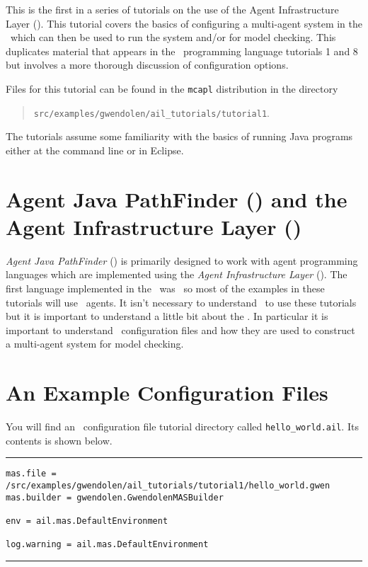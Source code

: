 
This is the first in a series of tutorials on the use of the Agent Infrastructure Layer (\ail).  This tutorial covers the basics of configuring a multi-agent system in the \ail\ which can then be used to run the system and/or for model checking.  This duplicates material that appears in the \gwendolen\ programming language tutorials 1 and 8 but involves a more thorough discussion of configuration options.

Files for this tutorial can be found in the \texttt{mcapl} distribution in the directory 
\begin{quote}
\texttt{src/examples/gwendolen/ail\_tutorials/tutorial1}.
\end{quote}

The tutorials assume some familiarity with the basics of running Java programs either at the command line or in Eclipse.

\section{Agent Java PathFinder (\ajpf) and the Agent Infrastructure Layer (\ail)}

\emph{Agent Java PathFinder} (\ajpf) is primarily designed to work with agent programming languages which are implemented using the \emph{Agent Infrastructure Layer} (\ail).  The first language implemented in the \ail\ was \gwendolen\ so most of the examples in these tutorials will use \gwendolen\ agents.  It isn't necessary to understand \gwendolen\ to use these tutorials but it is important to understand a little bit about the \ail.  In particular it is important to understand \ail\ configuration files and how they are used to construct a multi-agent system for model checking.

\section{An Example Configuration Files}

You will find an \ail\ configuration file tutorial directory called \texttt{hello\_world.ail}.  Its contents is shown below.

\newpage\noindent\rule{\textwidth}{1pt}
\begin{verbatim}
mas.file = /src/examples/gwendolen/ail_tutorials/tutorial1/hello_world.gwen
mas.builder = gwendolen.GwendolenMASBuilder

env = ail.mas.DefaultEnvironment

log.warning = ail.mas.DefaultEnvironment
\end{verbatim}
\rule{\textwidth}{1pt}


